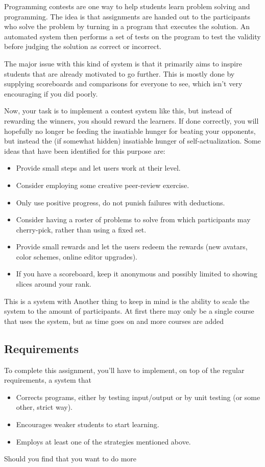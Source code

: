 Programming contests are one way to help students learn problem solving and programming. The idea is that assignments are handed out to the participants who solve the problem by turning in a program that executes the solution. An automated system then performs a set of tests on the program to test the validity before judging the solution as correct or incorrect.

The major issue with this kind of system is that it primarily aims to inspire students that are already motivated to go further. This is mostly done by supplying scoreboards and comparisons for everyone to see, which isn't very encouraging if you did poorly.

Now, your task is to implement a contest system like this, but instead of rewarding the winners, you should reward the learners. If done correctly, you will hopefully no longer be feeding the insatiable hunger for beating your opponents, but instead the (if somewhat hidden) insatiable hunger of self-actualization. Some ideas that have been identified for this purpose are:
\begin{itemize}
    \item Provide small steps and let users work at their level.
    \item Consider employing some creative peer-review exercise.
    \item Only use positive progress, do not punish failures with deductions.
    \item Consider having a roster of problems to solve from which participants may cherry-pick, rather than using a fixed set.
    \item Provide small rewards and let the users redeem the rewards (new avatars, color schemes, online editor upgrades).
    \item If you have a scoreboard, keep it anonymous and possibly limited to showing slices around your rank. 
\end{itemize}

This is a system with %
Another thing to keep in mind is the ability to scale the system to the amount of participants. At first there may only be a single course that uses the system, but as time goes on and more courses are added

\subsection{Requirements}
To complete this assignment, you'll have to implement, on top of the regular requirements, a system that
\begin{itemize}
    \item Corrects programs, either by testing input/output or by unit testing (or some other, strict way).
    \item Encourages weaker students to start learning.
    \item Employs at least one of the strategies mentioned above.
\end{itemize}
Should you find that you want to do more
